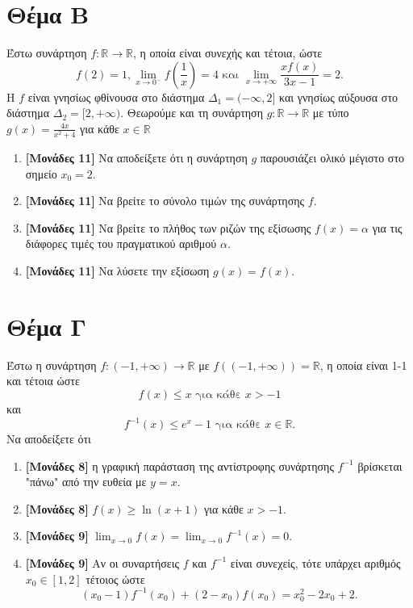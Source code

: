 \documentclass[12pt]{article}
\begin{document}
\section*{Θέμα Β}
  \noindent
  Έστω συνάρτηση $f:\mathbb{R}\to\mathbb{R}$, η οποία είναι συνεχής και τέτοια, ώστε
  $$f(2)=1, \lim_{x\to0^-}f(\frac{1}{x})=4 \text{ και } \lim_{x\to +\infty}\frac{xf(x)}{3x-1}=2.$$
  Η $f$ είναι γνησίως φθίνουσα στο διάστημα $Δ_1=(-\infty,2]$ και γνησίως αύξουσα στο διάστημα $Δ_2=[2,+\infty)$.
  Θεωρούμε και τη συνάρτηση $g:\mathbb{R}\to\mathbb{R}$ με τύπο $g(x)=\frac{4x}{x^2+4}$ για κάθε $x\in\mathbb{R}$
  \begin{enumerate}
    \item \textbf{[Μονάδες 11]} Να αποδείξετε ότι η συνάρτηση $g$ παρουσιάζει ολικό μέγιστο στο σημείο $x_0=2$.
    \item \textbf{[Μονάδες 11]} Να βρείτε το σύνολο τιμών της συνάρτησης $f$.
    \item \textbf{[Μονάδες 11]} Να βρείτε το πλήθος των ριζών της εξίσωσης $f(x)=α$ για τις διάφορες τιμές του πραγματικού αριθμού $α$.
    \item \textbf{[Μονάδες 11]} Να λύσετε την εξίσωση $g(x)=f(x)$.
  \end{enumerate}

\section*{Θέμα Γ}
  \noindent
  Έστω η συνάρτηση $f:(-1,+\infty)\to\mathbb{R}$ με $f\left((-1,+\infty)\right)=\mathbb{R}$, η οποία είναι 1-1 και τέτοια ώστε
  $$f(x)\le x \text{ για κάθε } x>-1$$
  και
  $$f^{-1}(x)\le e^x-1 \text{ για κάθε } x\in\mathbb{R}.$$
  Να αποδείξετε ότι
  \begin{enumerate}
    \item \textbf{[Μονάδες 8]} η γραφική παράσταση της αντίστροφης συνάρτησης $f^{-1}$ βρίσκεται "πάνω" από την ευθεία με $y=x$.
    \item \textbf{[Μονάδες 8]} $f(x)\ge \ln(x+1)$ για κάθε $x>-1$.
    \item \textbf{[Μονάδες 9]} $\lim_{x\to 0}f(x)=\lim_{x\to 0}f^{-1}(x)=0$.
    \item \textbf{[Μονάδες 9]} Αν οι συναρτήσεις $f$ και $f^{-1}$ είναι συνεχείς, τότε υπάρχει αριθμός $x_0\in [1,2]$ τέτοιος ώστε
    $$(x_0-1)f^{-1}(x_0)+(2-x_0)f(x_0)=x_0^2-2x_0+2.$$
  \end{enumerate}
\end{document}
